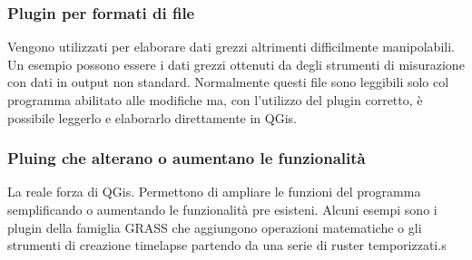 \subsubsection{Plugin per formati di file}
Vengono utilizzati per elaborare dati grezzi altrimenti difficilmente manipolabili. 
Un esempio possono essere i dati grezzi ottenuti da degli strumenti di misurazione con dati in output non standard.
Normalmente questi file sono leggibili solo col programma abilitato alle modifiche ma, con l'utilizzo del plugin corretto, è possibile leggerlo e elaborarlo direttamente in QGis.

\subsubsection{Pluing che alterano o aumentano le funzionalità}
La reale forza di QGis. Permettono di ampliare le funzioni del programma semplificando o aumentando le funzionalità pre esisteni. Alcuni esempi sono i plugin della famiglia GRASS che aggiungono operazioni matematiche o gli strumenti di creazione timelapse partendo da una serie di ruster temporizzati.s
